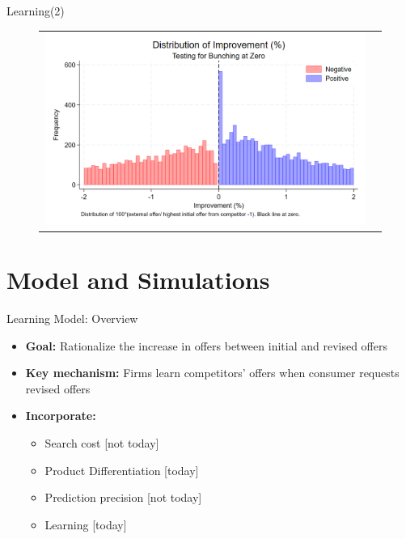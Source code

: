 \documentclass[10pt,aspectratio=169]{beamer}
\begin{document}
\begin{frame}{Learning(2)}\label{slide:fig5}
  \begin{figure}[H]
\centering{}%
\begin{tabular}{cc}
\includegraphics[scale=0.35]{../figures/IE7/IE7_hist_bunching_max(2).png} 
\end{tabular}
\end{figure}
\hyperlink{slide:Descriptive_evidence}{}
\end{frame}




\section{Model and Simulations}


\begin{frame}{Learning Model: Overview}
\begin{itemize}
    \item \textbf{Goal:} Rationalize the increase in offers between initial and revised offers
    
    \item \textbf{Key mechanism:} Firms learn competitors' offers when consumer requests revised offers
    


    \item \textbf{Incorporate:}
    \begin{itemize}
        \item Search cost [not today]
        \item Product Differentiation [today]
        \item Prediction precision [not today]
        \item Learning [today]
    \end{itemize}

\end{itemize}
\end{frame}
\end{document}
